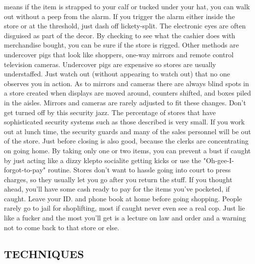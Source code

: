 \documentclass[11pt,twoside,a4paper]{book}
\begin{document}
means if the item is strapped to your calf or tucked under your hat, you can walk out without a peep from the alarm. If you trigger the alarm either inside the store or at the threshold, just dash off lickety-split. The electronic eyes are often disguised as part of the decor. By checking to see what the cashier does with merchandise bought, you can be sure if the store is rigged. Other methods are undercover pigs that look like shoppers, one-way mirrors and remote control television cameras. Undercover pigs are expensive so stores are usually understaffed. Just watch out (without appearing to watch out) that no one observes you in action. As to mirrors and cameras there are always blind spots in a store created when displays are moved around, counters shifted, and boxes piled in the aisles. Mirrors and cameras are rarely adjusted to fit these changes.  Don't get turned off by this security jazz. The percentage of stores that have sophisticated security systems such as those described is very small. If you work out at lunch time, the security guards and many of the sales personnel will be out of the store. Just before closing is also good, because the clerks are concentrating on going home. By taking only one or two items, you can prevent a bust if caught by just acting like a dizzy klepto socialite getting kicks or use the "Oh-gee-I-forgot-to-pay" routine. Stores don't want to hassle going into court to press charges, so they usually let you go after you return the stuff. If you thought ahead, you'll have some cash ready to pay for the items you've pocketed, if caught. Leave your ID. and phone book at home before going shopping. People rarely go to jail for shoplifting, most if caught never even see a real cop. Just lie like a fucker and the most you'll get is a lecture on law and order and a warning not to come back to that store or else.

\subsection{TECHNIQUES}
\end{document}
